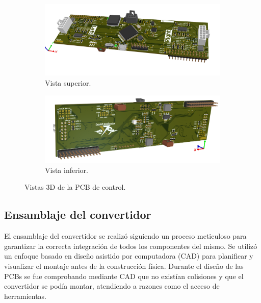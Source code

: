 \begin{figure}[H]
	\centering
	\begin{subfigure}{0.45\linewidth}
		\centering
		\includegraphics[width=\linewidth]{fig/invControl1}
		\caption{Vista superior.}
	\end{subfigure}
	\hspace{0.05\linewidth} %
	\begin{subfigure}{0.45\linewidth}
		\centering
		\includegraphics[width=\linewidth]{fig/invControl2}
		\caption{Vista inferior.}
	\end{subfigure}
	\caption{Vistas 3D de la PCB de control.}
	
\end{figure}

\subsection{Ensamblaje del convertidor}

El ensamblaje del convertidor se realizó siguiendo un proceso meticuloso para garantizar la correcta integración de todos los componentes del mismo. Se utilizó un enfoque basado en diseño asistido por computadora (CAD) para planificar y visualizar el montaje antes de la construcción física. Durante el diseño de las PCBs se fue comprobando mediante CAD que no existían colisiones y que el convertidor se podía montar, atendiendo a razones como el acceso de herramientas.


